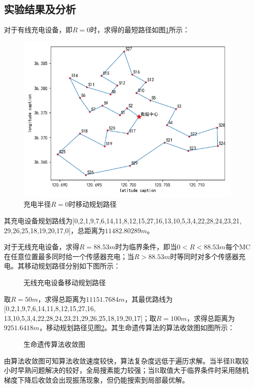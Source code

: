 \documentclass{whutmod}
\begin{document}
    \subsection{实验结果及分析}
        对于有线充电设备，即$R=0$时，求得的最短路径如图\ref{sssssssssss}所示：
        \begin{figure}[H]
        	\centering
        	\includegraphics[width=.8\textwidth]{figures/w1.png}
        	\caption{充电半径$R=0$时移动规划路径}\label{sssssssssss}
        \end{figure}
       其充电设备规划路线为[0,2,1,9,7,6,14,11,8,12,15,27,16,13,10,5,3,4,22,28,24,23,21,\\29,26,25,18,19,20,17,0]，总距离为$11482.80289m$。
        
        对于无线充电设备，求得$R=88.53m$时为临界条件，即当$0<R<88.53m$每个MC在任意位置最多同时给一个传感器充电；当$R>88.53m$时等同时对多个传感器充电。其移动规划路径分别如下图所示：
        \begin{figure}[H]
        	\centering
        	\caption{无线充电设备移动规划路径}
        	\label{ssw}
        \end{figure}
    
    取$R=50m$，求得总距离为$11151.7684m$，其最优路线为 [0,2,1,9,7,6,14,11,8,12,15,27,16,\\13,10,5,3,4,22,28,24,23,21,29,26,25,18,19,20,17]；取$R=100m$，求得总距离为$9251.6418m$，移动规划路径见图\ref{ssw}。其生命遗传算法的算法收敛图如图所示：
        \begin{figure}[H]
	\centering
	\caption{生命遗传算法收敛图}
		\end{figure}
	    由算法收敛图可知算法收敛速度较快，算法复杂度远低于遍历求解。当半径R取较小时早熟问题解决的较好，全局搜素能力较强；当R取值大于临界条件时采用随机梯度下降后收敛会出现振荡现象，但仍能搜索到局部最优解。
	
\end{document}
